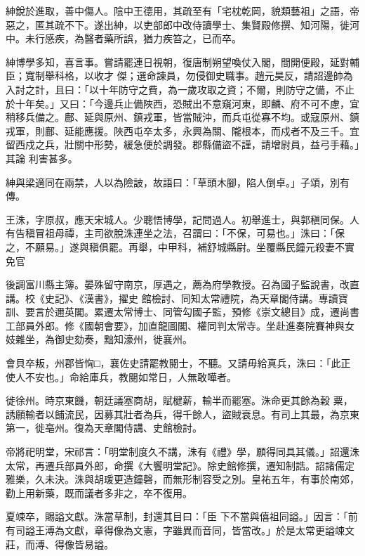 \begin{pinyinscope}
 紳銳於進取，善中傷人。陰中王德用，其疏至有「宅枕乾岡，貌類藝祖」之語，帝惡之，匿其疏不下。遂出紳，以吏部郎中改侍讀學士、集賢殿修撰、知河陽，徙河中。未行感疾，為醫者藥所誤，猶力疾笞之，已而卒。



 紳博學多知，喜言事。嘗請罷連日視朝，復唐制朔望喚仗入閣，間開便殿，延對輔臣；寬制舉科格，以收才
 傑；選命諫員，勿侵御史職事。趙元昊反，請詔邊帥為入討之計，且曰：「以十年防守之費，為一歲攻取之資；不爾，則防守之備，不止於十年矣。」又曰：「今邊兵止備陜西，恐賊出不意窺河東，即麟、府不可不慮，宜稍移兵備之。鄜、延與原州、鎮戎軍，皆當賊沖，而兵屯從寡不均。或寇原州、鎮戎軍，則鄜、延能應援。陜西屯卒太多，永興為關、隴根本，而戍者不及三千。宜留西戍之兵，壯關中形勢，緩急便於調發。郡縣備盜不謹，請增尉員，益弓手藉。」其論
 利害甚多。



 紳與梁適同在兩禁，人以為險詖，故語曰：「草頭木腳，陷人倒卓。」子頌，別有傳。



 王洙，字原叔，應天宋城人。少聰悟博學，記問過人。初舉進士，與郭稹同保。人有告稹冒祖母禫，主司欲脫洙連坐之法，召謂曰：「不保，可易也。」洙曰：「保之，不願易。」遂與稹俱罷。再舉，中甲科，補舒城縣尉。坐覆縣民鐘元殺妻不實免官



 後調富川縣主簿。晏殊留守南京，厚遇之，薦為府學教授。召為國子監說書，改直講。校《史記》、《漢書》，擢史
 館檢討、同知太常禮院，為天章閣侍講。專讀寶訓、要言於邇英閣。累遷太常博士、同管勾國子監，預修《崇文總目》成，遷尚書工部員外郎。修《國朝會要》，加直龍圖閣、權同判太常寺。坐赴進奏院賽神與女妓雜坐，為御史劾奏，黜知濠州，徙襄州。



 會貝卒叛，州郡皆恟□，襄佐史請罷教閱士，不聽。又請毋給真兵，洙曰：「此正使人不安也。」命給庫兵，教閱如常日，人無敢嘩者。



 徙徐州。時京東饑，朝廷議塞商胡，賦楗薪，輸半而罷塞。洙命更其餘為穀
 粟，誘願輸者以餔流民，因募其壯者為兵，得千餘人，盜賊衰息。有司上其最，為京東第一，徙亳州。復為天章閣侍講、史館檢討。



 帝將祀明堂，宋祁言：「明堂制度久不講，洙有《禮》學，願得同具其儀。」詔還洙太常，再遷兵部員外郎，命撰《大饗明堂記》。除史館修撰，遷知制誥。詔諸儒定雅樂，久未決。洙與胡瑗更造鐘磬，而無形制容受之別。皇祐五年，有事於南郊，勸上用新藥，既而議者多非之，卒不復用。



 夏竦卒，賜謚文獻。洙當草制，封還其目曰：「臣
 下不當與僖祖同謚。」因言：「前有司謚王溥為文獻，章得像為文憲，字雖異而音同，皆當改。」於是太常更謚竦文莊，而溥、得像皆易謚。




\end{pinyinscope}
